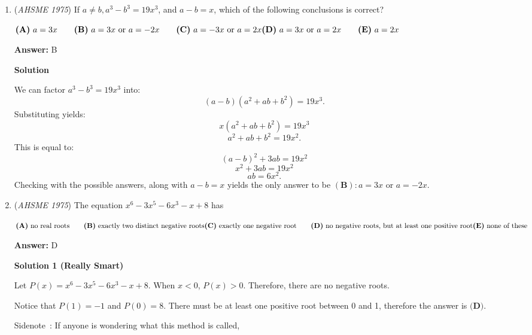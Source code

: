 \begin{enumerate}
 "Hence, the perpendicular through A passes through K. Since angle PAK=90, angle PAK is inscribed in the semicircular arc PK"

 (Volume 2 , Chapter 20)

 


	\item (\textit{AHSME 1975}) If $a \neq b, a^3 - b^3 = 19x^3$, and $a-b = x$, which of the following conclusions is correct? 


 $\textbf{(A)}\ a=3x \qquad  \textbf{(B)}\ a=3x \text{ or } a = -2x \qquad  \textbf{(C)}\ a=-3x \text{ or } a = 2x \qquad \\ \textbf{(D)}\ a=3x \text{ or } a=2x \qquad  \textbf{(E)}\ a=2x$

 \textbf{Answer: }B



\textbf{Solution}

We can factor $a^3-b^3=19x^3$ into:
 \[(a-b)(a^2+ab+b^2)=19x^3.\]Substituting yields:
 \[x(a^2+ab+b^2)=19x^3\]
 \[a^2+ab+b^2=19x^2.\]This is equal to:
 \[(a-b)^2+3ab=19x^2\]
 \[x^2+3ab=19x^2\]
 \[ab=6x^2.\]Checking with the possible answers, along with $a-b=x$ yields the only answer to be $\boxed{(\textbf{B}): a=3x\text{ or }a=-2x}.$



	\item (\textit{AHSME 1975}) The equation $x^6 - 3x^5 - 6x^3 - x + 8$ has 


 $\textbf{(A)}\ \text{no real roots} \qquad  \textbf{(B)}\ \text{exactly two distinct negative roots} \qquad \\ \textbf{(C)}\ \text{exactly one negative root} \qquad  \textbf{(D)}\ \text{no negative roots, but at least one positive root} \qquad \\ \textbf{(E)}\ \text{none of these}$

 \textbf{Answer: }D



\textbf{Solution 1 (Really Smart)}

Let $P(x) = x^6 - 3x^5 - 6x^3 - x + 8$. When $x < 0$, $P(x) > 0$. Therefore, there are no negative roots. 

 Notice that $P(1) = -1$ and $P(0) = 8$. There must be at least one positive root between 0 and 1, therefore the answer is $\boxed{\textbf{(D)}}$.

 


 
Sidenote : If anyone is wondering what this method is called,


\end{enumerate}
